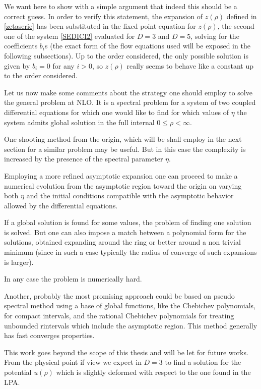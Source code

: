 We want here to show with a simple argument that indeed this should be a correct guess.
In order to verify this statement, the expansion of $z(\rho)$ defined in 
\eqref{zetaserie} has been substituted in the fixed point equation for $z(\rho)$, the second one of the system \eqref{SEDICI2} 
evaluated for $D=3$ and $D=5$,  solving for the coefficients $b_i$s (the exact form of the flow equations used will be exposed in the following subsections).
Up to the order considered, the only possible solution is given by $b_i=0$ for any $i>0$, so $z(\rho)$ really seems to behave like a constant up to the order considered.


Let us now make some comments about the strategy one should employ to solve the general problem at NLO.
It is a spectral problem for a system of two coupled differential equations for which one would like to find for which values of $\eta$ the system admits global solution in the full internal $0\le\rho< \infty$.

One shooting method from the origin, which will be shall employ in the next section for a similar problem may be useful.
But in this case the complexity is increased by the presence of the spectral parameter $\eta$.

Employing a more refined asymptotic expansion one can proceed to make a numerical evolution from the asymptotic region toward the origin on varying both $\eta$ and the initial conditions compatible
with the asymptotic behavior allowed by the differential equations. 

If a global solution is found for some values, the problem of finding one solution is solved. But one can also impose a match between a polynomial form for the solutions, 
obtained expanding around the ring or better around a non trivial minimum (since in such a case typically the radius of converge of such expansions is larger).

In any case the problem is numerically hard.

Another, probably the most promising approach could be based on pseudo spectral method using a base of global functions, like the Chebichev polynomials, for compact intervals, 
and the rational Chebichev polynomials for treating unbounded rintervals which include the asymptotic region.
This method generally has fast converges properties.

This work goes beyond the scope of this thesis and will be let for future works.
From the physical point if view we expect in $D=3$ to find a solution for the potential $u(\rho)$ which is slightly deformed with respect to the one found in the LPA.








